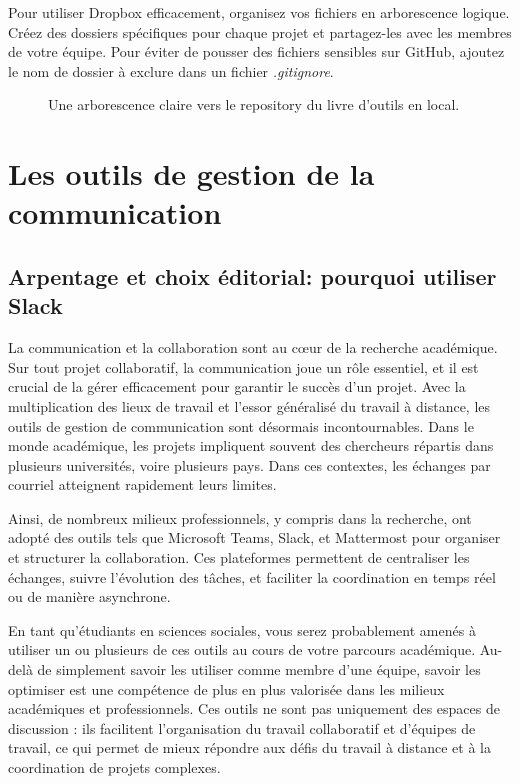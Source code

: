 \documentclass[
  letterpaper,
  DIV=11,
  numbers=noendperiod]{scrreprt}
\begin{document}
Pour utiliser Dropbox efficacement, organisez vos fichiers en
arborescence logique. Créez des dossiers spécifiques pour chaque projet
et partagez-les avec les membres de votre équipe. Pour éviter de pousser
des fichiers sensibles sur GitHub, ajoutez le nom de dossier à exclure
dans un fichier \emph{.gitignore}.

\begin{figure}


\caption{\label{fig-dropbox}Une arborescence claire vers le repository
du livre d'outils en local.}

\end{figure}%

\section{Les outils de gestion de la
communication}\label{les-outils-de-gestion-de-la-communication}

\subsection{Arpentage et choix éditorial: pourquoi utiliser
Slack}\label{arpentage-et-choix-uxe9ditorial-pourquoi-utiliser-slack}

La communication et la collaboration sont au cœur de la recherche
académique. Sur tout projet collaboratif, la communication joue un rôle
essentiel, et il est crucial de la gérer efficacement pour garantir le
succès d'un projet. Avec la multiplication des lieux de travail et
l'essor généralisé du travail à distance, les outils de gestion de
communication sont désormais incontournables. Dans le monde académique,
les projets impliquent souvent des chercheurs répartis dans plusieurs
universités, voire plusieurs pays. Dans ces contextes, les échanges par
courriel atteignent rapidement leurs limites.

Ainsi, de nombreux milieux professionnels, y compris dans la recherche,
ont adopté des outils tels que Microsoft Teams, Slack, et Mattermost
pour organiser et structurer la collaboration. Ces plateformes
permettent de centraliser les échanges, suivre l'évolution des tâches,
et faciliter la coordination en temps réel ou de manière asynchrone.

En tant qu'étudiants en sciences sociales, vous serez probablement
amenés à utiliser un ou plusieurs de ces outils au cours de votre
parcours académique. Au-delà de simplement savoir les utiliser comme
membre d'une équipe, savoir les optimiser est une compétence de plus en
plus valorisée dans les milieux académiques et professionnels. Ces
outils ne sont pas uniquement des espaces de discussion : ils facilitent
l'organisation du travail collaboratif et d'équipes de travail, ce qui
permet de mieux répondre aux défis du travail à distance et à la
coordination de projets complexes.
\end{document}
